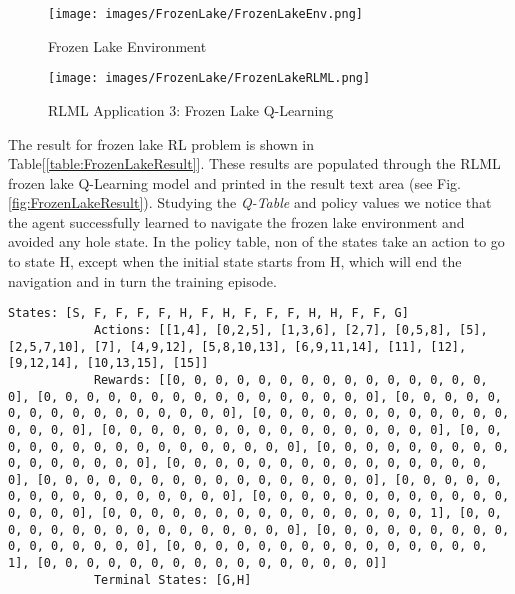\documentclass[11pt,letterpaper]{ryersonSGSThesis}
\begin{document}
\begin{ryersonSGSThesis}
    \begin{figure}[!tbh]
        \centering
        \texttt{[image: images/FrozenLake/FrozenLakeEnv.png]}
        \caption{Frozen Lake Environment}
        \label{fig:FrozenLakeEnv}
    \end{figure}
    
    \begin{figure}[!tbh]
        \centering
        \texttt{[image: images/FrozenLake/FrozenLakeRLML.png]}
        \caption{RLML Application 3: Frozen Lake Q-Learning}
        \label{fig:FrozenLakeRLML}
    \end{figure}
    
    The result for frozen lake RL problem is shown in Table[\ref{table:FrozenLakeResult}]. These results are populated through the RLML frozen lake Q-Learning model and printed in the result text area (see Fig. \ref{fig:FrozenLakeResult}). Studying the \emph{Q-Table} and policy values we notice that the agent successfully learned to navigate the frozen lake environment and avoided any hole state. In the policy table, non of the states take an action to go to state H, except when the initial state starts from H, which will end the navigation and in turn the training episode.
    
    \begin{minipage}{\linewidth}
        \begin{lstlisting}[caption={The Input Values for Frozen Lake Environment},label={lst:label1}]
            States: [S, F, F, F, F, H, F, H, F, F, F, H, H, F, F, G]
            Actions: [[1,4], [0,2,5], [1,3,6], [2,7], [0,5,8], [5], [2,5,7,10], [7], [4,9,12], [5,8,10,13], [6,9,11,14], [11], [12], [9,12,14], [10,13,15], [15]]
            Rewards: [[0, 0, 0, 0, 0, 0, 0, 0, 0, 0, 0, 0, 0, 0, 0, 0], [0, 0, 0, 0, 0, 0, 0, 0, 0, 0, 0, 0, 0, 0, 0, 0], [0, 0, 0, 0, 0, 0, 0, 0, 0, 0, 0, 0, 0, 0, 0, 0], [0, 0, 0, 0, 0, 0, 0, 0, 0, 0, 0, 0, 0, 0, 0, 0], [0, 0, 0, 0, 0, 0, 0, 0, 0, 0, 0, 0, 0, 0, 0, 0], [0, 0, 0, 0, 0, 0, 0, 0, 0, 0, 0, 0, 0, 0, 0, 0], [0, 0, 0, 0, 0, 0, 0, 0, 0, 0, 0, 0, 0, 0, 0, 0], [0, 0, 0, 0, 0, 0, 0, 0, 0, 0, 0, 0, 0, 0, 0, 0], [0, 0, 0, 0, 0, 0, 0, 0, 0, 0, 0, 0, 0, 0, 0, 0], [0, 0, 0, 0, 0, 0, 0, 0, 0, 0, 0, 0, 0, 0, 0, 0], [0, 0, 0, 0, 0, 0, 0, 0, 0, 0, 0, 0, 0, 0, 0, 0], [0, 0, 0, 0, 0, 0, 0, 0, 0, 0, 0, 0, 0, 0, 0, 1], [0, 0, 0, 0, 0, 0, 0, 0, 0, 0, 0, 0, 0, 0, 0, 0], [0, 0, 0, 0, 0, 0, 0, 0, 0, 0, 0, 0, 0, 0, 0, 0], [0, 0, 0, 0, 0, 0, 0, 0, 0, 0, 0, 0, 0, 0, 0, 1], [0, 0, 0, 0, 0, 0, 0, 0, 0, 0, 0, 0, 0, 0, 0, 0]]
            Terminal States: [G,H]
        \end{lstlisting}
    \end{minipage}


\end{ryersonSGSThesis}
\end{document}
